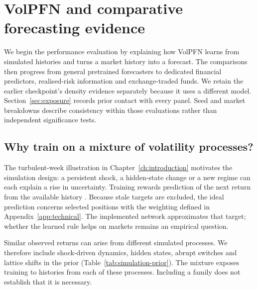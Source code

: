 \chapter{VolPFN and comparative forecasting evidence}
\label{ch:forecast}

We begin the performance evaluation by explaining how VolPFN learns from simulated histories and turns a market history into a forecast. The comparisons then progress from general pretrained forecasters to dedicated financial predictors, realised-risk information and exchange-traded funds. We retain the earlier checkpoint's density evidence separately because it uses a different model. Section~\ref{sec:exposure} records prior contact with every panel. Seed and market breakdowns describe consistency within those evaluations rather than independent significance tests.

\section{Why train on a mixture of volatility processes?}

The turbulent-week illustration in Chapter~\ref{ch:introduction} motivates the simulation design: a persistent shock, a hidden-state change or a new regime can each explain a rise in uncertainty. Training rewards prediction of the next return from the available history \citep{muller2022transformers}. Because stale targets are excluded, the ideal prediction concerns selected positions with the weighting defined in Appendix~\ref{app:technical}. The implemented network approximates that target; whether the learned rule helps on markets remains an empirical question.

Similar observed returns can arise from different simulated processes. We therefore include shock-driven dynamics, hidden states, abrupt switches and lattice shifts in the prior (Table~\ref{tab:simulation-prior}). The mixture exposes training to histories from each of these processes. Including a family does not establish that it is necessary.

